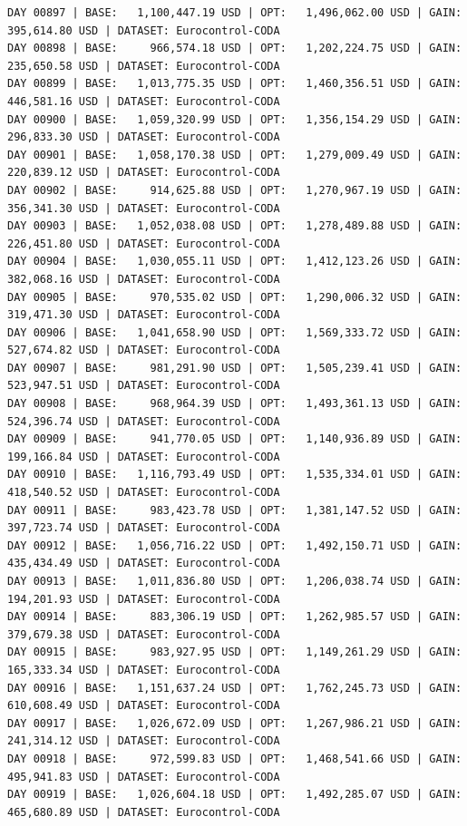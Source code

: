 \documentclass[11pt,a4paper]{article}
\begin{document}
\begin{verbatim}
DAY 00897 | BASE:   1,100,447.19 USD | OPT:   1,496,062.00 USD | GAIN: 395,614.80 USD | DATASET: Eurocontrol-CODA
DAY 00898 | BASE:     966,574.18 USD | OPT:   1,202,224.75 USD | GAIN: 235,650.58 USD | DATASET: Eurocontrol-CODA
DAY 00899 | BASE:   1,013,775.35 USD | OPT:   1,460,356.51 USD | GAIN: 446,581.16 USD | DATASET: Eurocontrol-CODA
DAY 00900 | BASE:   1,059,320.99 USD | OPT:   1,356,154.29 USD | GAIN: 296,833.30 USD | DATASET: Eurocontrol-CODA
DAY 00901 | BASE:   1,058,170.38 USD | OPT:   1,279,009.49 USD | GAIN: 220,839.12 USD | DATASET: Eurocontrol-CODA
DAY 00902 | BASE:     914,625.88 USD | OPT:   1,270,967.19 USD | GAIN: 356,341.30 USD | DATASET: Eurocontrol-CODA
DAY 00903 | BASE:   1,052,038.08 USD | OPT:   1,278,489.88 USD | GAIN: 226,451.80 USD | DATASET: Eurocontrol-CODA
DAY 00904 | BASE:   1,030,055.11 USD | OPT:   1,412,123.26 USD | GAIN: 382,068.16 USD | DATASET: Eurocontrol-CODA
DAY 00905 | BASE:     970,535.02 USD | OPT:   1,290,006.32 USD | GAIN: 319,471.30 USD | DATASET: Eurocontrol-CODA
DAY 00906 | BASE:   1,041,658.90 USD | OPT:   1,569,333.72 USD | GAIN: 527,674.82 USD | DATASET: Eurocontrol-CODA
DAY 00907 | BASE:     981,291.90 USD | OPT:   1,505,239.41 USD | GAIN: 523,947.51 USD | DATASET: Eurocontrol-CODA
DAY 00908 | BASE:     968,964.39 USD | OPT:   1,493,361.13 USD | GAIN: 524,396.74 USD | DATASET: Eurocontrol-CODA
DAY 00909 | BASE:     941,770.05 USD | OPT:   1,140,936.89 USD | GAIN: 199,166.84 USD | DATASET: Eurocontrol-CODA
DAY 00910 | BASE:   1,116,793.49 USD | OPT:   1,535,334.01 USD | GAIN: 418,540.52 USD | DATASET: Eurocontrol-CODA
DAY 00911 | BASE:     983,423.78 USD | OPT:   1,381,147.52 USD | GAIN: 397,723.74 USD | DATASET: Eurocontrol-CODA
DAY 00912 | BASE:   1,056,716.22 USD | OPT:   1,492,150.71 USD | GAIN: 435,434.49 USD | DATASET: Eurocontrol-CODA
DAY 00913 | BASE:   1,011,836.80 USD | OPT:   1,206,038.74 USD | GAIN: 194,201.93 USD | DATASET: Eurocontrol-CODA
DAY 00914 | BASE:     883,306.19 USD | OPT:   1,262,985.57 USD | GAIN: 379,679.38 USD | DATASET: Eurocontrol-CODA
DAY 00915 | BASE:     983,927.95 USD | OPT:   1,149,261.29 USD | GAIN: 165,333.34 USD | DATASET: Eurocontrol-CODA
DAY 00916 | BASE:   1,151,637.24 USD | OPT:   1,762,245.73 USD | GAIN: 610,608.49 USD | DATASET: Eurocontrol-CODA
DAY 00917 | BASE:   1,026,672.09 USD | OPT:   1,267,986.21 USD | GAIN: 241,314.12 USD | DATASET: Eurocontrol-CODA
DAY 00918 | BASE:     972,599.83 USD | OPT:   1,468,541.66 USD | GAIN: 495,941.83 USD | DATASET: Eurocontrol-CODA
DAY 00919 | BASE:   1,026,604.18 USD | OPT:   1,492,285.07 USD | GAIN: 465,680.89 USD | DATASET: Eurocontrol-CODA

\end{verbatim}
\end{document}
